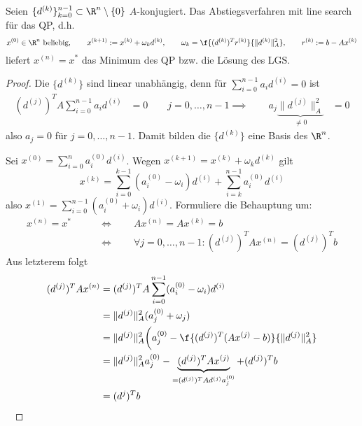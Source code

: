 \documentclass[11pt]{scrbook}
\begin{document}
\begin{st}[Konvergenz] \label{4.17}
	Seien $\{d^{(k)}\}_{k=0}^{n-1} \subset \R^n \setminus \{0\}$ $A$-konjugiert.
	Das Abstiegsverfahren mit line search für das QP, d.h.
	\[
		x^{(0)} \in \R^n \text{ beliebig},
		\qquad x^{(k+1)} := x^{(k)} + \omega_k d^{(k)},
		\qquad \omega_k = \f{(d^{(k)})^T r^{(k)}}{\|d^{(k)}\|_A^2},
		\qquad r^{(k)} := b - Ax^{(k)}
	\]
	liefert $x^{(n)} = x^*$ das Minimum des QP bzw. die Lösung des LGS.
	\begin{proof}
		Die $\{d^{(k)}\}$ sind linear unabhängig, denn für $\sum_{i=0}^{n-1} a_i d^{(i)} = 0$ ist
		\begin{align*}
			(d^{(j)})^T A \sum_{i=0}^{n-1} a_i d^{(i)} &= 0  \qquad j= 0, \dotsc, n-1
			\implies \qquad a_j \underbrace{\|d^{(j)}\|_A^2}_{\neq 0} &= 0 
		\end{align*}
		also $a_j = 0$ für $j=0,\dotsc,n-1$.
		Damit bilden die $\{d^{(k)}\}$ eine Basis des $\R^n$.

		Sei $x^{(0)} = \sum_{i=0}^n a_i^{(0)} d^{(i)}$.
		Wegen $x^{(k+1)} = x^{(k)} + \omega_k d^{(k)}$ gilt
		\[
			x^{(k)} = \sum_{i=0}^{k-1} (a_i^{(0)} - \omega_i)d^{(i)} + \sum_{i=k}^{n-1} a_i^{(0)} d^{(i)}
		\]
		also $x^{(1)} = \sum_{i=0}^{n-1} (a_i^{(0)}+\omega_i) d^{(i)}$.
		Formuliere die Behauptung um:
		\begin{align*}
			x^{(n)} = x^* \qquad &\iff \qquad Ax^{(n)} = A x^{(k)} = b \\
			\qquad &\iff \qquad \forall j=0,\dotsc,n-1 : (d^{(j)})^T A x^{(n)} = (d^{(j)})^T b
		\end{align*}
		Aus letzterem folgt
		\begin{align*}
			(d^{(j)})^T A x^{(n)} 
			&= (d^{(j)})^T A \sum_{i=0}^{n-1} (a_i^{(0)}-\omega_i) d^{(i)} \\
			&= \|d^{(j)}\|_A^2 (a_j^{(0)}+\omega_j) \\
			&= \|d^{(j)}\|_A^2 \bigg( a_j^{(0)} - \f{(d^{(j)})^T (Ax^{(j)}-b)}{\|d^{(j)}\|_A^2} \\
			&= \|d^{(j)}\|_A^2 a_j^{(0)} - \underbrace{(d^{(j)})^T Ax^{(j)}}_{= (d^{(j)})^T A d^{(j)}a_j^{(0)}} + (d^{(j)})^T b \\
			&= (d^{j})^T b
		\end{align*}~
	\end{proof}
\end{st}
\end{document}
